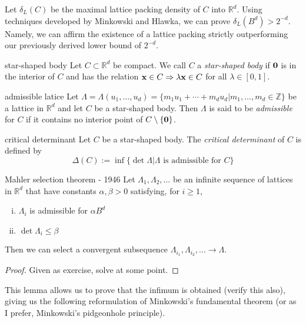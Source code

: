 \documentclass{article}
\begin{document}
Let $\delta_L(C)$ be the maximal lattice packing density of $C$ into $\mathbb{R}^d$. Using techniques developed by 
Minkowski and Hlawka, we can prove $\delta_L(B^d) > 2^{-d}$. Namely, we can affirm the existence of a lattice packing 
strictly outperforming our previously derived lower bound of $2^{-d}$.  

\begin{definition}[]{star-shaped body}
    Let $C \subset \mathbb{R}^d$ be compact. We call $C$ a {\it star-shaped body} if ${\bf 0}$ is in the interior 
    of $C$ and has the relation ${\bf x} \in C \Rightarrow \lambda {\bf x} \in C$ for all $\lambda \in [0, 1]$.
\end{definition}

\begin{definition}[]{admissible latice}
    Let $\Lambda = \Lambda(u_1, \dots, u_d) = \{m_1 u_1 + \cdots + m_d u_d | m_1, \dots, m_d \in \mathbb{Z}\}$ be a 
    lattice in $\mathbb{R}^d$ and let $C$ be a star-shaped body. Then $\Lambda$ is said to be {\it admissible} for 
    $C$ if it contains no interior point of $C\setminus \{{\bf 0}\}$.
\end{definition}

\begin{definition}[]{critical determinant}
    Let $C$ be a star-shaped body. The {\it critical determinant} of $C$ is defined by 
    \[\Delta(C) := \inf \{\det \Lambda | \Lambda \text{ is admissible for } C\}\]
\end{definition}

\begin{lemma}[]{Mahler selection theorem - 1946}
    Let $\Lambda_1, \Lambda_2, \dots$ be an infinite sequence of lattices in $\mathbb{R}^d$ that have constants 
    $\alpha, \beta > 0$ satisfying, for $i \geq 1$, 
    \begin{enumerate}[(i)]
        \item $\Lambda_i$ is admissible for $\alpha B^d$
        \item $\det \Lambda_i \leq \beta$
    \end{enumerate}
    Then we can select a convergent subsequence $\Lambda_{i_1}, \Lambda_{i_2}, \dots \to \Lambda$.
\end{lemma}

\begin{proof}
    Given as exercise, solve at some point.
\end{proof}

This lemma allows us to prove that the infimum is obtained (verify this also), giving us the following reformulation
of Minkowski's fundamental theorem (or as I prefer, Minkowski's pidgeonhole principle).
\end{document}
